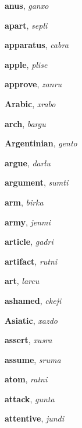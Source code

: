 \documentclass[12pt]{book}
\begin{document}
\begin{description}
\item[ ] \textbf{anus}, \textit{ganxo}

\item[ ] \textbf{apart}, \textit{sepli}

\item[ ] \textbf{apparatus}, \textit{cabra}

\item[ ] \textbf{apple}, \textit{plise}

\item[ ] \textbf{approve}, \textit{zanru}

\item[ ] \textbf{Arabic}, \textit{xrabo}

\item[ ] \textbf{arch}, \textit{bargu}

\item[ ] \textbf{Argentinian}, \textit{gento}

\item[ ] \textbf{argue}, \textit{darlu}

\item[ ] \textbf{argument}, \textit{sumti}

\item[ ] \textbf{arm}, \textit{birka}

\item[ ] \textbf{army}, \textit{jenmi}

\item[ ] \textbf{article}, \textit{gadri}

\item[ ] \textbf{artifact}, \textit{rutni}

\item[ ] \textbf{art}, \textit{larcu}

\item[ ] \textbf{ashamed}, \textit{ckeji}

\item[ ] \textbf{Asiatic}, \textit{xazdo}

\item[ ] \textbf{assert}, \textit{xusra}

\item[ ] \textbf{assume}, \textit{sruma}

\item[ ] \textbf{atom}, \textit{ratni}

\item[ ] \textbf{attack}, \textit{gunta}

\item[ ] \textbf{attentive}, \textit{jundi}


\end{description}
\end{document}
